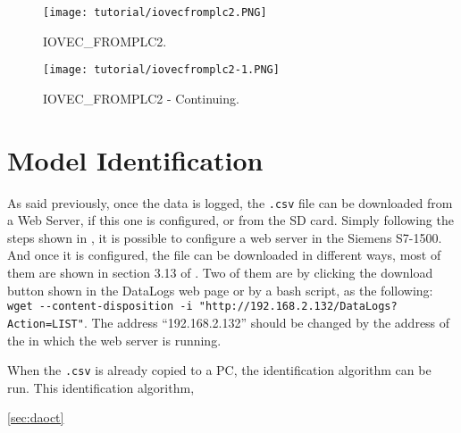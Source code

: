 \begin{figure}[H] \centering
 \texttt{[image: tutorial/iovecfromplc2.PNG]}
  \caption{IOVEC\_FROMPLC2.}
  \label{fig:iovecFromPlc}
\end{figure}

\begin{figure}[H] \centering
 \texttt{[image: tutorial/iovecfromplc2-1.PNG]}
  \caption{IOVEC\_FROMPLC2 - Continuing.}
  \label{fig:iovecFromPlctwo}
\end{figure}



\section{Model Identification}
As said previously, once the data is logged, the \verb|.csv| file can be downloaded from a Web Server, if
this one is configured, or from the SD card. Simply following the steps shown in
\cite{webserverSiemens}, it is possible to configure a web server in the Siemens
\PLC S7-1500. And once it is configured, the file can be downloaded in different
ways, most of them are shown in section 3.13 of \cite{webserverSiemens}. Two of
them are by clicking
the download button shown in the DataLogs web page or by a bash script, as the following: \newline
\verb|wget --content-disposition -i "http://192.168.2.132/DataLogs?Action=LIST"|.
The address ``192.168.2.132'' should be changed by the address of the \PLC{} in which
the web server is running.

When the \verb|.csv| is already copied to a PC, the identification algorithm can
be run. This identification algorithm, 

\ref{sec:daoct}
